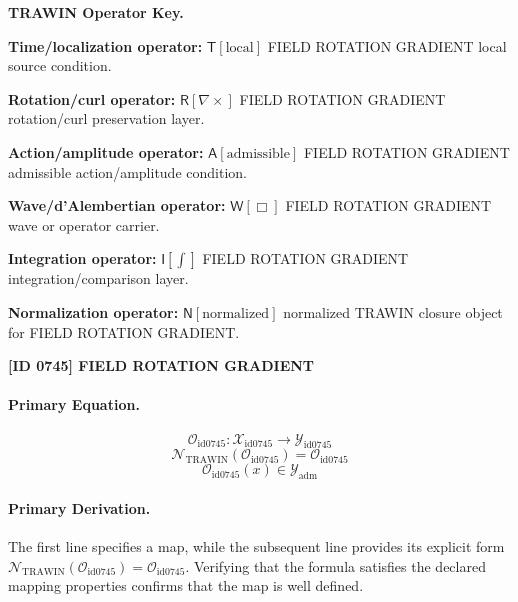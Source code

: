\par\vspace{0.45\baselineskip}
\noindent\begin{minipage}[t]{\linewidth}
\begingroup
\small
\raggedright
\textbf{TRAWIN Operator Key.}\par
\noindent\textbf{Time/localization operator:} $\mathsf{T}\!\left[\mathrm{local}\right]$ FIELD ROTATION GRADIENT local source condition.\par
\noindent\textbf{Rotation/curl operator:} $\mathsf{R}\!\left[\nabla\times\right]$ FIELD ROTATION GRADIENT rotation/curl preservation layer.\par
\noindent\textbf{Action/amplitude operator:} $\mathsf{A}\!\left[\mathrm{admissible}\right]$ FIELD ROTATION GRADIENT admissible action/amplitude condition.\par
\noindent\textbf{Wave/d'Alembertian operator:} $\mathsf{W}\!\left[\Box\right]$ FIELD ROTATION GRADIENT wave or operator carrier.\par
\noindent\textbf{Integration operator:} $\mathsf{I}\!\left[\int\right]$ FIELD ROTATION GRADIENT integration/comparison layer.\par
\noindent\textbf{Normalization operator:} $\mathsf{N}\!\left[\mathrm{normalized}\right]$ normalized TRAWIN closure object for FIELD ROTATION GRADIENT.\par
\endgroup
\end{minipage}

\clearpage
\noindent\textbf{[ID 0745] FIELD ROTATION GRADIENT}\par
\vspace{0.35em}
\paragraph{Primary Equation.}
\[
\mathcal{O}_{\mathrm{id0745}}:\mathcal{X}_{\mathrm{id0745}}\longrightarrow\mathcal{Y}_{\mathrm{id0745}}
\]
\[
\mathcal{N}_{\mathrm{TRAWIN}}(\mathcal{O}_{\mathrm{id0745}})=\mathcal{O}_{\mathrm{id0745}}
\]
\[
\mathcal{O}_{\mathrm{id0745}}(x)\in\mathcal{Y}_{\mathrm{adm}}
\]

\paragraph{Primary Derivation.}
The first line specifies a map, while the subsequent line provides its explicit form \( \mathcal{N}_{\mathrm{TRAWIN}}(\mathcal{O}_{\mathrm{id0745}})=\mathcal{O}_{\mathrm{id0745}} \). Verifying that the formula satisfies the declared mapping properties confirms that the map is well defined.
